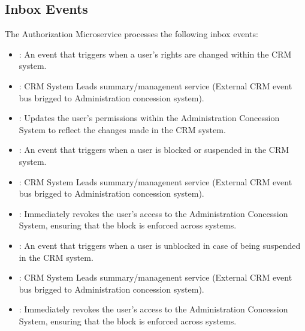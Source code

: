 \documentclass[letterpaper,10pt,english]{sphinxmanual}
\begin{document}
\subsection{Inbox Events}
\label{\detokenize{administration_concession_system/authorization_service:inbox-events}}
\sphinxAtStartPar
The Authorization Microservice processes the following inbox events:

\sphinxAtStartPar
{}
\begin{itemize}
\item {} 
\sphinxAtStartPar
{}: An event that triggers when a user’s rights are changed within the CRM system.

\item {} 
\sphinxAtStartPar
{}: CRM System \textendash{} Leads summary/managenent service (External CRM event bus brigged to Administration concession system).

\item {} 
\sphinxAtStartPar
{}: Updates the user’s permissions within the Administration Concession System to reflect the changes made in the CRM system.

\end{itemize}

\sphinxAtStartPar
{}
\begin{itemize}
\item {} 
\sphinxAtStartPar
{}: An event that triggers when a user is blocked or suspended in the CRM system.

\item {} 
\sphinxAtStartPar
{}: CRM System \textendash{} Leads summary/managenent service  (External CRM event bus brigged to Administration concession system).

\item {} 
\sphinxAtStartPar
{}: Immediately revokes the user’s access to the Administration Concession System, ensuring that the block is enforced across systems.

\end{itemize}

\sphinxAtStartPar
{}
\begin{itemize}
\item {} 
\sphinxAtStartPar
{}: An event that triggers when a user is unblocked in case of being suspended in the CRM system.

\item {} 
\sphinxAtStartPar
{}: CRM System \textendash{} Leads summary/managenent service  (External CRM event bus brigged to Administration concession system).

\item {} 
\sphinxAtStartPar
{}: Immediately revokes the user’s access to the Administration Concession System, ensuring that the block is enforced across systems.

\end{itemize}
\end{document}
